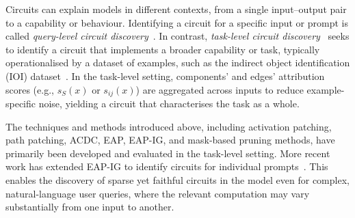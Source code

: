Circuits can explain models in different contexts, from a single input--output pair to a capability or behaviour. Identifying a circuit for a specific input or prompt is called \emph{query-level circuit discovery}~. In contrast, \emph{task-level circuit discovery}~ seeks to identify a circuit that implements a broader capability or task, typically operationalised by a dataset of examples, such as the indirect object identification (IOI) dataset~. In the task-level setting, components’ and edges’ attribution scores (e.g., $s_S(x)$ or $s_{ij}(x)$) are aggregated across inputs to reduce example-specific noise, yielding a circuit that characterises the task as a whole.

The techniques and methods introduced above, including activation patching, path patching, ACDC, EAP, EAP-IG, and mask-based pruning methods, have primarily been developed and evaluated in the task-level setting. More recent work has extended EAP-IG to identify circuits for individual prompts~. This enables the discovery of sparse yet faithful circuits in the model even for complex, natural-language user queries, where the relevant computation may vary substantially from one input to another.

